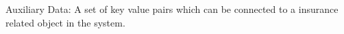 %
%


\begin{description}[CABR]
\item[AuxData]{Auxiliary Data: A set of key value pairs which can be connected to a insurance related object in the system.}
\end{description}
